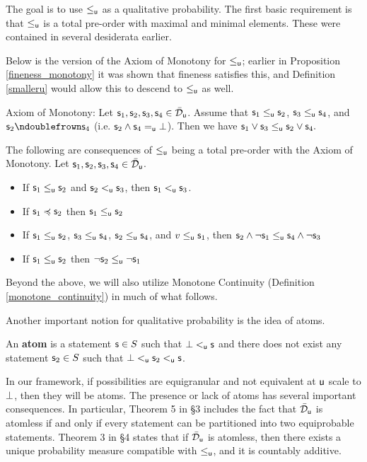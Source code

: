 \documentclass[10pt, onecolumn, longbibliography, nofootinbib]{revtex4-2}
\begin{document}
The goal is to use $\lequ$ as a qualitative probability. The first basic requirement is that $\leq_{\stmt[u]}$ is a total pre-order with maximal and minimal elements. These were contained in several desiderata earlier. 

Below is the version of the Axiom of Monotony for $\lequ$; earlier in Proposition \ref{fineness_monotony} it was shown that fineness satisfies this, and Definition \ref{smalleru} would allow this to descend to $\lequ$ as well. 

Axiom of Monotony: 
Let $\stmt_1,\stmt_2,\stmt_3,\stmt_4\in \tdomain_{\stmt[u]}$. Assume that $\stmt_1\leq_{\stmt[u]} \stmt_2$, $\stmt_3\leq_{\stmt[u]} \stmt_4$, and $\stmt_2\ncomp \stmt_4$ (i.e. $\stmt_2\AND \stmt_4 =_{\stmt[u]} \impossibility$). Then we have $\stmt_1\OR \stmt_3 \leq_{\stmt[u]} \stmt_2\OR \stmt_4.$

The following are consequences of $\lequ$ being a total pre-order with the Axiom of Monotony. Let $\stmt_1,\stmt_2,\stmt_3,\stmt_4\in \tdomain_{\stmt[u]}$.
\begin{itemize}
    \item If $\stmt_1\leq_{\stmt[u]} \stmt_2$ and $\stmt_2<_{\stmt[u]} \stmt_3$, then $\stmt_1<_{\stmt[u]}\stmt_3$. 
    \item If $\stmt_1\narrower \stmt_2$ then $\stmt_1\leq_{\stmt[u]} \stmt_2$
    \item If $\stmt_1\leq_{\stmt[u]} \stmt_2$, $\stmt_3\leq_{\stmt[u]} \stmt_4$, $\stmt_2\leq_{\stmt[u]} \stmt_4$, and $v\leq_{\stmt[u]} \stmt_1$, then $\stmt_2 \AND \NOT \stmt_1 \leq_{\stmt[u]} \stmt_4 \AND \NOT \stmt_3$
    \item If $\stmt_1\leq_{\stmt[u]} \stmt_2$ then $\NOT \stmt_2 \leq_{\stmt[u]}\NOT \stmt_1$
\end{itemize}

Beyond the above, we will also utilize Monotone Continuity (Definition \ref{monotone_continuity}) in much of what follows. 

Another important notion for qualitative probability is the idea of atoms. 

\begin{defn}
An \textbf{atom} is a statement $\stmt\in S$ such that $\impossibility<_{\stmt[u]}\stmt$ and there does not exist any statement $\stmt_2\in S$ such that $\impossibility<_{\stmt[u]} \stmt_2<_{\stmt[u]} \stmt$. 
\end{defn}
In our framework, if possibilities are equigranular and not equivalent at $\stmt[u]$ scale to $\impossibility$, then they will be atoms. The presence or lack of atoms has several important consequences. In particular, Theorem 5 in \cite{villegas} \S3 includes the fact that $\tdomain_{\stmt[u]}$ is atomless if and only if every statement can be partitioned into two equiprobable statements. Theorem 3 in \S4 states that if $\tdomain_{\stmt[u]}$ is atomless, then there exists a unique probability measure compatible with $\leq_{\stmt[u]}$, and it is countably additive. 
\end{document}
